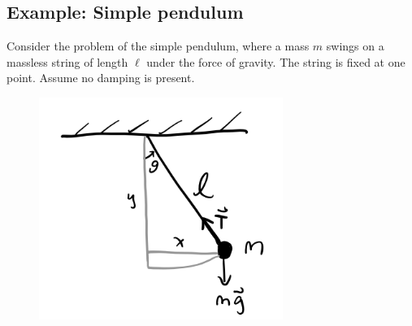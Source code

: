\documentclass[
  letterpaper,
  DIV=11,
  numbers=noendperiod]{scrreprt}
\begin{document}
\hypertarget{example-simple-pendulum}{%
\subsection{Example: Simple pendulum}\label{example-simple-pendulum}}

Consider the problem of the simple pendulum, where a mass \(m\) swings
on a massless string of length \(\ell\) under the force of gravity. The
string is fixed at one point. Assume no damping is present.

\begin{figure}

{\centering \includegraphics[width=3.125in,height=\textheight]{classical-mechanics/./resources/image-20230212040128210.png}

}

\end{figure}
\end{document}
